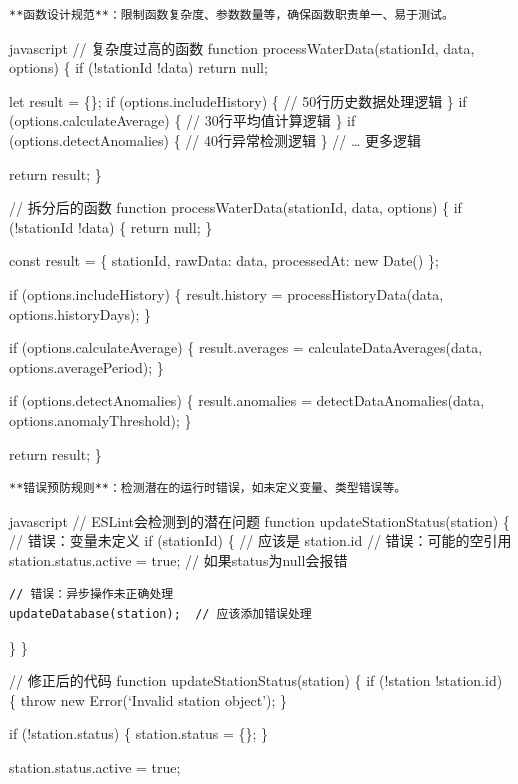 {{\begin{lstlisting}
**函数设计规范**：限制函数复杂度、参数数量等，确保函数职责单一、易于测试。
\end{lstlisting}

javascript // 复杂度过高的函数 function processWaterData(stationId, data, options) \{ if (!stationId \textbar\textbar{} !data) return null;

let result = \{\}; if (options.includeHistory) \{ // 50行历史数据处理逻辑 \} if (options.calculateAverage) \{ // 30行平均值计算逻辑 \} if (options.detectAnomalies) \{ // 40行异常检测逻辑 \} // \ldots{} 更多逻辑

return result; \}

// 拆分后的函数 function processWaterData(stationId, data, options) \{ if (!stationId \textbar\textbar{} !data) \{ return null; \}

const result = \{ stationId, rawData: data, processedAt: new Date() \};

if (options.includeHistory) \{ result.history = processHistoryData(data, options.historyDays); \}

if (options.calculateAverage) \{ result.averages = calculateDataAverages(data, options.averagePeriod); \}

if (options.detectAnomalies) \{ result.anomalies = detectDataAnomalies(data, options.anomalyThreshold); \}

return result; \}

\begin{lstlisting}
**错误预防规则**：检测潜在的运行时错误，如未定义变量、类型错误等。
\end{lstlisting}

javascript // ESLint会检测到的潜在问题 function updateStationStatus(station) \{ // 错误：变量未定义 if (stationId) \{ // 应该是 station.id // 错误：可能的空引用 station.status.active = true; // 如果status为null会报错

\begin{verbatim}
// 错误：异步操作未正确处理
updateDatabase(station);  // 应该添加错误处理
\end{verbatim}

\} \}

// 修正后的代码 function updateStationStatus(station) \{ if (!station \textbar\textbar{} !station.id) \{ throw new Error(`Invalid station object'); \}

if (!station.status) \{ station.status = \{\}; \}

station.status.active = true;

}}
